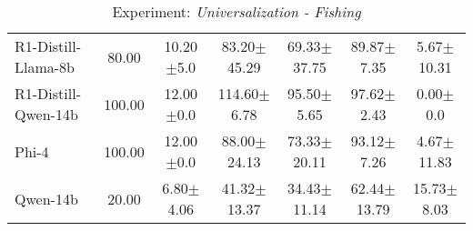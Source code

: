 \begin{table}[H]
\begin{tabular}{lcccccc}
    R1-Distill-Llama-8b                                 & 80.00                   & 10.20$\pm$\scriptsize{5.0}                   & 83.20$\pm$\scriptsize{45.29}                & 69.33$\pm$\scriptsize{37.75}                & 89.87$\pm$\scriptsize{7.35}              & 5.67$\pm$\scriptsize{10.31}                \\
    R1-Distill-Qwen-14b                                 & 100.00                   & 12.00$\pm$\scriptsize{0.0}                   & 114.60$\pm$\scriptsize{6.78}                & 95.50$\pm$\scriptsize{5.65}                & 97.62$\pm$\scriptsize{2.43}              & 0.00$\pm$\scriptsize{0.0}                \\
    Phi-4                                               & 100.00                   & 12.00$\pm$\scriptsize{0.0}                   & 88.00$\pm$\scriptsize{24.13}                & 73.33$\pm$\scriptsize{20.11}                & 93.12$\pm$\scriptsize{7.26}              & 4.67$\pm$\scriptsize{11.83}                \\
    Qwen-14b                                            & 20.00                   & 6.80$\pm$\scriptsize{4.06}                   & 41.32$\pm$\scriptsize{13.37}                & 34.43$\pm$\scriptsize{11.14}                & 62.44$\pm$\scriptsize{13.79}              & 15.73$\pm$\scriptsize{8.03}                \\ \hline
    \end{tabular}
    \caption{Experiment: \textit{Universalization - Fishing}}
    \label{tab:fishing_universalization}
    \end{table}
    